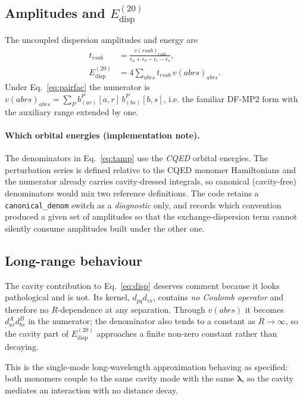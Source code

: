 \documentclass[11pt]{article}
\newcommand{\lam}{\bm{\lambda}}
\begin{document}
\subsection{Amplitudes and \texorpdfstring{$E^{(20)}_{\mathrm{disp}}$}{Edisp20}}

The uncoupled dispersion amplitudes and energy are
\begin{align}
t_{rsab} &= \frac{v(rsab)_{rsab}}
{\epsilon_a + \epsilon_b - \epsilon_r - \epsilon_s},
\label{eq:tamp}\\[4pt]
E^{(20)}_{\mathrm{disp}} &= 4 \sum_{abrs} t_{rsab}\, v(abrs)_{abrs} .
\label{eq:disp}
\end{align}
Under Eq.~\eqref{eq:pairfac} the numerator is
$v(abrs)_{abrs} = \sum_P b^{P}_{(ar)}[a,r]\, b^{P}_{(bs)}[b,s]$, i.e. the
familiar DF-MP2 form with the auxiliary range extended by one.

\paragraph{Which orbital energies (implementation note).} The denominators in
Eq.~\eqref{eq:tamp} use the \emph{CQED} orbital energies. The perturbation
series is defined relative to the CQED monomer Hamiltonians and the numerator
already carries cavity-dressed integrals, so canonical (cavity-free)
denominators would mix two reference definitions. The code retains a
\texttt{canonical\_denom} switch as a \emph{diagnostic} only, and records which
convention produced a given set of amplitudes so that the
exchange-dispersion term cannot silently consume amplitudes built under the
other one.

\subsection{Long-range behaviour}
\label{sec:longrange}

The cavity contribution to Eq.~\eqref{eq:disp} deserves comment because it
looks pathological and is not. Its kernel, $d_{pq}d_{rs}$, contains \emph{no
Coulomb operator} and therefore no $R$-dependence at any separation. Through
$v(abrs)$ it becomes $d^{A}_{ar} d^{B}_{bs}$ in the numerator; the denominator
also tends to a constant as $R\to\infty$, so the cavity part of
$E^{(20)}_{\mathrm{disp}}$ approaches a finite non-zero constant rather than
decaying.

This is the single-mode long-wavelength approximation behaving as specified:
both monomers couple to the same cavity mode with the same $\lam$, so the
cavity mediates an interaction with no distance decay.
\end{document}
